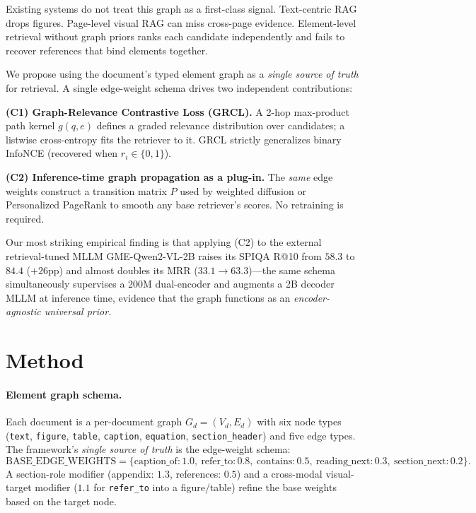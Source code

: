 \documentclass{article}
\begin{document}
Existing systems do not treat this graph as a first-class signal. Text-centric
RAG drops figures. Page-level visual RAG \cite{colpali,visrag} can miss
cross-page evidence. Element-level retrieval without graph priors ranks each
candidate independently and fails to recover references that bind elements
together.

We propose using the document's typed element graph as a \emph{single
source of truth} for retrieval. A single edge-weight schema drives two
independent contributions:

\textbf{(C1) Graph-Relevance Contrastive Loss (GRCL).} A 2-hop max-product
path kernel $g(q,e)$ defines a graded relevance distribution over candidates;
a listwise cross-entropy fits the retriever to it. GRCL strictly generalizes
binary InfoNCE (recovered when $r_i \in \{0,1\}$).

\textbf{(C2) Inference-time graph propagation as a plug-in.} The \emph{same}
edge weights construct a transition matrix $P$ used by weighted diffusion or
Personalized PageRank to smooth any base retriever's scores. No retraining
is required.

Our most striking empirical finding is that applying (C2) to the external
retrieval-tuned MLLM GME-Qwen2-VL-2B \cite{gme} raises its SPIQA R@10 from
$58.3$ to $84.4$ ($+26$pp) and almost doubles its MRR
($33.1\!\to\!63.3$)---the same schema simultaneously supervises a 200M
dual-encoder and augments a 2B decoder MLLM at inference time, evidence that
the graph functions as an \emph{encoder-agnostic universal prior}.

\section{Method}

\paragraph{Element graph schema.} Each document is a per-document graph
$G_d=(V_d,E_d)$ with six node types (\texttt{text}, \texttt{figure},
\texttt{table}, \texttt{caption}, \texttt{equation}, \texttt{section\_header})
and five edge types. The framework's \emph{single source of truth} is the
edge-weight schema:
\[
\text{BASE\_EDGE\_WEIGHTS} = \big\{\text{caption\_of}\!:\!1.0,\ \text{refer\_to}\!:\!0.8,\ \text{contains}\!:\!0.5,\ \text{reading\_next}\!:\!0.3,\ \text{section\_next}\!:\!0.2\big\}.
\]
A section-role modifier (appendix: $1.3$, references: $0.5$) and a
cross-modal visual-target modifier ($1.1$ for \texttt{refer\_to} into a
figure/table) refine the base weights based on the target node.
\end{document}
